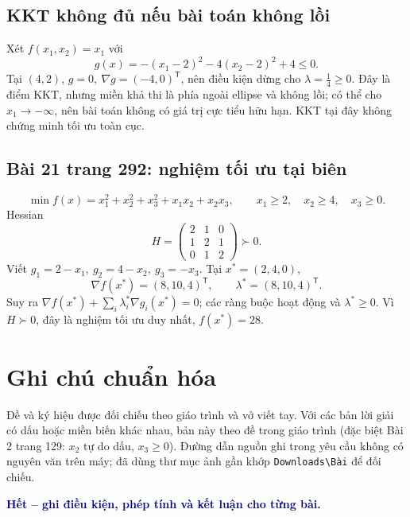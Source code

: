 \documentclass[11pt,a4paper]{article}
\newcommand{\grad}{\nabla}
\newcommand{\T}{^{\mathsf T}}
\begin{document}
\subsection{KKT không đủ nếu bài toán không lồi}
Xét \(f(x_1,x_2)=x_1\) với
\[
g(x)=-(x_1-2)^2-4(x_2-2)^2+4\le0.
\]
Tại \((4,2)\), \(g=0,\ \grad g=(-4,0)\T\), nên điều kiện dừng cho \(\lambda=\tfrac14\ge0\). Đây là điểm KKT, nhưng miền khả thi là phía ngoài ellipse và không lồi; có thể cho \(x_1\to-\infty\), nên bài toán không có giá trị cực tiểu hữu hạn. KKT tại đây không chứng minh tối ưu toàn cục.

\subsection{Bài 21 trang 292: nghiệm tối ưu tại biên}
\[
\min f(x)=x_1^2+x_2^2+x_3^2+x_1x_2+x_2x_3,\qquad
x_1\ge2,\quad x_2\ge4,\quad x_3\ge0.
\]
Hessian
\[
H=\begin{pmatrix}2&1&0\\1&2&1\\0&1&2\end{pmatrix}\succ0.
\]
Viết \(g_1=2-x_1,\ g_2=4-x_2,\ g_3=-x_3\). Tại \(x^\ast=(2,4,0)\),
\[
\grad f(x^\ast)=(8,10,4)\T,\qquad \lambda^\ast=(8,10,4)\T.
\]
Suy ra \(\grad f(x^\ast)+\sum_i\lambda_i^\ast\grad g_i(x^\ast)=0\); các ràng buộc hoạt động và \(\lambda^\ast\ge0\). Vì \(H\succ0\), đây là nghiệm tối ưu duy nhất, \(f(x^\ast)=28\).

\section*{Ghi chú chuẩn hóa}
Đề và ký hiệu được đối chiếu theo giáo trình và vở viết tay. Với các bản lời giải có dấu hoặc miền biến khác nhau, bản này theo đề trong giáo trình (đặc biệt Bài 2 trang 129: \(x_2\) tự do dấu, \(x_3\ge0\)). Đường dẫn nguồn ghi trong yêu cầu không có nguyên văn trên máy; đã dùng thư mục ảnh gần khớp \texttt{Downloads\textbackslash Bài} để đối chiếu.

\vfill
\begin{center}
\textcolor{navy}{\textbf{Hết -- ghi điều kiện, phép tính và kết luận cho từng bài.}}
\end{center}
\end{document}
